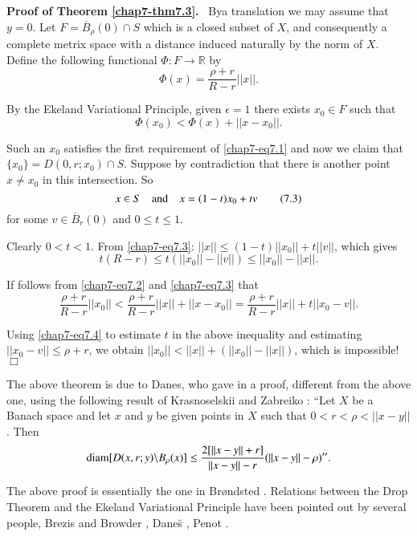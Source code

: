 \noindent
{\bf Proof of Theorem \ref{chap7-thm7.3}.}~ By\pageoriginale a
translation we may assume that $y=0$. Let
$F=\overline{B}_{\rho}(0)\cap S$ which is a closed subset of $X$, and
consequently a complete metrix space with a distance induced naturally
by the norm of $X$. Define the following functional $\Phi:F\to
\mathbb{R}$ by
$$
\Phi(x)=\frac{\rho+r}{R-r}||x||.
$$

By the Ekeland Variational Principle, given $\epsilon=1$ there exists
$x_{0}\in F$ such that
\begin{equation*}
\Phi(x_{0})<\Phi(x)+||x-x_{0}||.\tag{7.2}\label{chap7-eq7.2}
\end{equation*}

Such an $x_{0}$ satisfies the first requirement of \eqref{chap7-eq7.1}
and now we claim that $\{x_{0}\}=D(0,r;x_{0})\cap S$. Suppose by
contradiction that there is another point $x\neq x_{0}$ in this
intersection. So
\begin{equation*}
x\in S\quad\text{and}\quad x=(1-t)x_{0}+tv\tag{7.3}\label{chap7-eq7.3}
\end{equation*}
for some $v\in \overline{B}_{r}(0)$ and $0\leq t\leq 1$.

Clearly $0<t<1$. From \eqref{chap7-eq7.3}: $||x||\leq
(1-t)||x_{0}||+t||v||$, which gives 
\begin{equation*}
t(R-r)\leq t(||x_{0}||-||v||)\leq
||x_{0}||-||x||.\tag{7.4}\label{chap7-eq7.4} 
\end{equation*}

If follows from \eqref{chap7-eq7.2} and \eqref{chap7-eq7.3} that
$$
\frac{\rho+r}{R-r}||x_{0}||<\frac{\rho+r}{R-r}||x||+||x-x_{0}||=\frac{\rho+r}{R-r}||x||+t||x_{0}-v||. 
$$

Using \eqref{chap7-eq7.4} to estimate $t$ in the above inequality and
estimating $||x_{0}-v||\leq \rho+r$, we obtain
$||x_{0}||<||x||+(||x_{0}||-||x||)$, which is impossible!\hfill$\Box$

\begin{remark*}
The above theorem is due to Danes, who gave in \cite{key30} a proof,
different from the above one, using the following result of
Krasnoselskii and Zabreiko \cite{key55}: ``Let $X$ be a Banach space
and let $x$ and $y$ be given points in $X$ such that
$0<r<\rho<||x-y||$. Then
$$
\operatorname{diam}[D(x,r;y)\backslash B_{\rho}(x)]\leq
\frac{2[||x-y||+r]}{||x-y||-r}(||x-y||-\rho)''. 
$$

The above proof is essentially the one in Br{\o}ndsted
\cite{key17}. Relations between the Drop Theorem and the Ekeland
Variational Principle have been pointed out by several people, Brezis
and Browder \cite{key16}, Dane\u{s} \cite{key31}, Penot \cite{key61}. 
\end{remark*}

